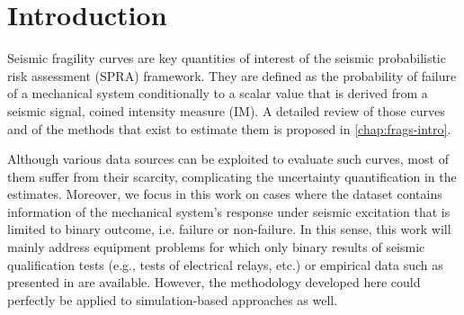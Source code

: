 \minitoc

\section{Introduction}


Seismic fragility curves are key quantities of interest of the seismic probabilistic risk assessment (SPRA) framework.
They are defined as the probability of failure of a mechanical system conditionally to a scalar value that is derived from a seismic signal, coined intensity measure (IM).
A detailed review of those curves and of the methods that exist to estimate them is proposed in   \cref{chap:frags-intro}.

Although various data sources can be exploited to evaluate such curves, most of them  suffer from their scarcity,
complicating the uncertainty quantification in the estimates.
Moreover, we focus in this work on cases where the dataset contains information of the mechanical system's response under seismic excitation that is limited to binary outcome, i.e. failure or non-failure.
In this sense, this work will mainly address equipment problems for which only binary results of seismic qualification tests (e.g., tests of electrical relays, etc.) or empirical data such as presented in \cite{straub_improved_2008} are available. However, the methodology developed here could perfectly be applied to simulation-based approaches as well.



